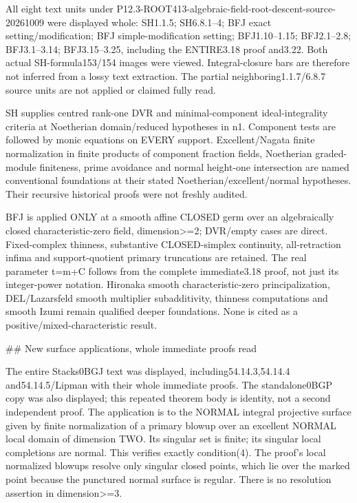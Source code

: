 \documentclass[11pt]{article}
\begin{document}
All eight text units under P12.3-ROOT413-algebraic-field-root-descent-source-20261009 were displayed whole: SH1.1.5; SH6.8.1--4; BFJ exact setting/modification; BFJ simple-modification setting; BFJ1.10--1.15; BFJ2.1--2.8; BFJ3.1--3.14; BFJ3.15--3.25, including the ENTIRE3.18 proof and3.22. Both actual SH-formula153/154 images were viewed. Integral-closure bars are therefore not inferred from a lossy text extraction. The partial neighboring1.1.7/6.8.7 source units are not applied or claimed fully read.

SH supplies centred rank-one DVR and minimal-component ideal-integrality criteria at Noetherian domain/reduced hypotheses in n1. Component tests are followed by monic equations on EVERY support. Excellent/Nagata finite normalization in finite products of component fraction fields, Noetherian graded-module finiteness, prime avoidance and normal height-one intersection are named conventional foundations at their stated Noetherian/excellent/normal hypotheses. Their recursive historical proofs were not freshly audited.

BFJ is applied ONLY at a smooth affine CLOSED germ over an algebraically closed characteristic-zero field, dimension>=2; DVR/empty cases are direct. Fixed-complex thinness, substantive CLOSED-simplex continuity, all-retraction infima and support-quotient primary truncations are retained. The real parameter t=m+C follows from the complete immediate3.18 proof, not just its integer-power notation. Hironaka smooth characteristic-zero principalization, DEL/Lazarsfeld smooth multiplier subadditivity, thinness computations and smooth Izumi remain qualified deeper foundations. None is cited as a positive/mixed-characteristic result.

\#\# New surface applications, whole immediate proofs read

The entire Stacks0BGJ text was displayed, including54.14.3,54.14.4 and54.14.5/Lipman with their whole immediate proofs. The standalone0BGP copy was also displayed; this repeated theorem body is identity, not a second independent proof. The application is to the NORMAL integral projective surface given by finite normalization of a primary blowup over an excellent NORMAL local domain of dimension TWO. Its singular set is finite; its singular local completions are normal. This verifies exactly condition(4). The proof's local normalized blowups resolve only singular closed points, which lie over the marked point because the punctured normal surface is regular. There is no resolution assertion in dimension>=3.
\end{document}

